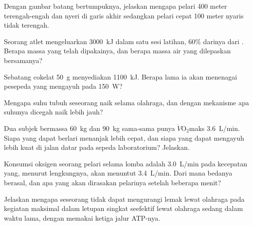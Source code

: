 \begin{exercise}[$\star\star$]\label{exo:g10:exercise-and-energy:8}
Dengan gambar batang bertumpuknya, jelaskan mengapa pelari 400 meter
terengah-engah dan nyeri di garis akhir sedangkan pelari cepat 100
meter nyaris tidak terengah.
\end{exercise}

\begin{exercise}[$\star\star$]\label{exo:g10:exercise-and-energy:9}
Seorang atlet mengeluarkan \qty{3000}{kJ} dalam satu sesi latihan, 60\%
darinya dari . Berapa massa  yang telah dipakainya,
dan berapa massa air yang dilepaskan bersamanya?
\end{exercise}

\begin{exercise}[$\star\star$]\label{exo:g10:exercise-and-energy:10}
Sebatang cokelat \qty{50}{g} menyediakan \qty{1100}{kJ}. Berapa lama ia
akan menenagai pesepeda yang mengayuh pada \qty{150}{W}?
\end{exercise}

\begin{exercise}[$\star\star$]\label{exo:g10:exercise-and-energy:11}
Mengapa suhu tubuh seseorang naik selama olahraga, dan dengan mekanisme
apa suhunya dicegah naik lebih jauh?
\end{exercise}

\begin{exercise}[$\star\star\star$]\label{exo:g10:exercise-and-energy:12}
Dua subjek bermassa \qty{60}{kg} dan \qty{90}{kg} sama-sama punya
$\dot V\!\mathrm{O_2}$maks \qty{3.6}{L/min}. Siapa yang dapat berlari
menanjak lebih cepat, dan siapa yang dapat mengayuh lebih kuat di jalan
datar pada sepeda laboratorium? Jelaskan.
\end{exercise}

\begin{exercise}[$\star\star\star$]\label{exo:g10:exercise-and-energy:13}
Konsumsi oksigen seorang pelari selama lomba adalah \qty{3.0}{L/min}
pada kecepatan yang, menurut lengkungnya, akan menuntut
\qty{3.4}{L/min}. Dari mana bedanya berasal, dan apa yang akan
dirasakan pelarinya setelah beberapa menit?
\end{exercise}

\begin{exercise}[$\star\star\star$]\label{exo:g10:exercise-and-energy:14}
Jelaskan mengapa seseorang tidak dapat mengurangi lemak lewat olahraga
pada kegiatan maksimal dalam letupan singkat seefektif lewat olahraga
sedang dalam waktu lama, dengan memakai ketiga jalur ATP-nya.
\end{exercise}

